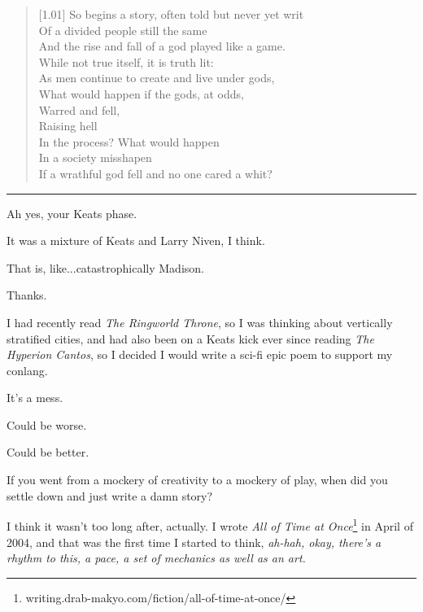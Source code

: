 \begin{paracol}{2}
\begin{leftcolumn}
\begin{verse}[1.01\textwidth]
So begins a story, often told but never yet writ\\
\vin Of a divided people still the same\\
\vin And the rise and fall of a god played like a game.\\
While not true itself, it is truth lit:\\
\vin As men continue to create and live under gods,\\
\vin What would happen if the gods, at odds,\\
\vin \vin Warred and fell,\\
\vin \vin Raising hell\\
\vin In the process? What would happen\\
\vin In a society misshapen\\
If a wrathful god fell and no one cared a whit?
\end{verse}

\begin{center}
\rule{1in}{0.1pt}
\end{center}

\begin{ally}
Ah yes, your Keats phase.
\end{ally}
It was a mixture of Keats and Larry Niven, I think.

\begin{ally}
That is, like...catastrophically Madison.
\end{ally}
Thanks.

I had recently read \emph{The Ringworld Throne}, so I was thinking about vertically stratified cities, and had also been on a Keats kick ever since reading \emph{The Hyperion Cantos}, so I decided I would write a sci-fi epic poem to support my conlang.

It's a mess.

\begin{ally}
Could be worse.
\end{ally}
Could be better.
\newpage

\begin{ally}
If you went from a mockery of creativity to a mockery of play, when did you settle down and just write a damn story?
\end{ally}
I think it wasn't too long after, actually. I wrote \emph{All of Time at Once}\footnote{writing.drab-makyo.com/fiction/all-of-time-at-once/} in April of 2004, and that was the first time I started to think, \emph{ah-hah, okay, there's a rhythm to this, a pace, a set of mechanics as well as an art.}


\end{leftcolumn}
\end{paracol}
